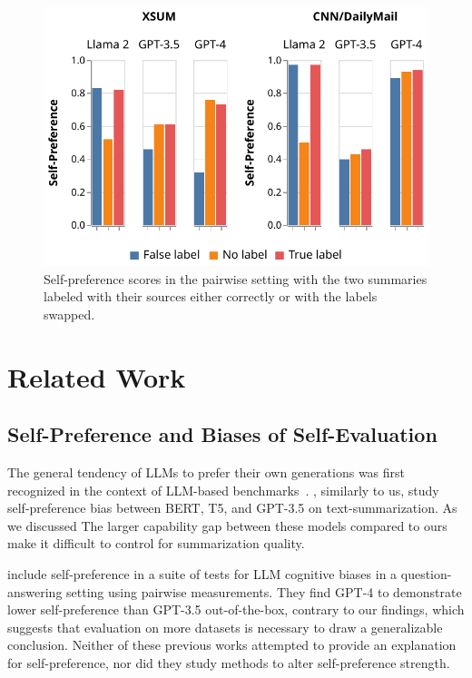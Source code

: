 \documentclass{article}
\theoremstyle{plain}
\theoremstyle{definition}
\theoremstyle{remark}
\begin{document}
\begin{figure} \centering
\includegraphics[width=\columnwidth]{images/labeling_source.pdf}
\caption{Self-preference scores in the pairwise setting with the two summaries labeled with their sources either correctly or with the labels swapped.}
\label{fig:labeling_source}
\end{figure}


\section{Related Work}
\label{sec:related_work}

\subsection{Self-Preference and Biases of Self-Evaluation}

The general tendency of LLMs to prefer their own generations was first recognized in the context of LLM-based benchmarks~\citep{bitton2023visit,zheng2024judging,bai2024benchmarking}.
\citet{liuLLMsNarcissisticEvaluators2023}, similarly to us, study self-preference bias between BERT, T5, and GPT-3.5 on text-summarization.
As we discussed 
The larger capability gap between these models compared to ours make it difficult to control for summarization quality. 

\citet{koo2023benchmarking} include self-preference in a suite of tests for LLM cognitive biases in a question-answering setting using pairwise measurements.
They find GPT-4 to demonstrate lower self-preference than GPT-3.5 out-of-the-box, contrary to our findings, which suggests that evaluation on more datasets is necessary to draw a generalizable conclusion.
Neither of these previous works attempted to provide an explanation for self-preference, nor did they study methods to alter self-preference strength.
\end{document}
